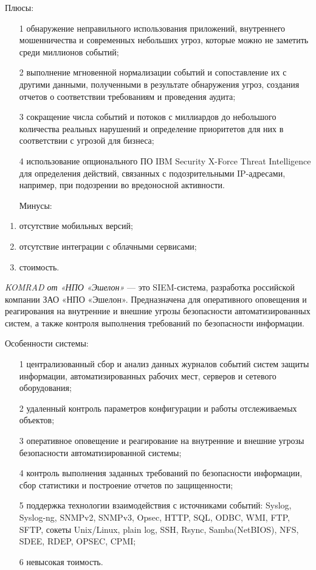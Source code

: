 Плюсы:
\begin{enumerate}
\item [1]обнаружение неправильного использования приложений, внутреннего мошенничества и современных небольших угроз, которые можно не заметить среди миллионов событий;
\item [2]выполнение мгновенной нормализации событий и сопоставление их с другими данными, полученными в результате обнаружения угроз, создания отчетов о соответствии требованиям и проведения аудита; 
\item [3]сокращение числа событий и потоков с миллиардов до небольшого количества реальных нарушений и определение приоритетов для них в соответствии с угрозой для бизнеса;
\item [4]использование опционального ПО IBM Security X-Force Threat Intelligence для определения действий, связанных с подозрительными IP-адресами, например, при подозрении во вредоносной активности.

\newpage
Минусы:
\end{enumerate}
\begin {enumerate}
\item[1]отсутствие мобильных версий;
\item[2]отсутствие интеграции с облачными сервисами;
\item[3]стоимость.
\end{enumerate}




\textit{KOMRAD от «НПО «Эшелон»} --- это SIEM-система, разработка российской компании ЗАО «НПО «Эшелон». Предназначена для оперативного оповещения и реагирования на внутренние и внешние угрозы безопасности автоматизированных систем, а также контроля выполнения требований по безопасности информации.

Особенности системы:
\begin{enumerate}
    \item [1]централизованный сбор и анализ данных журналов событий систем защиты информации, автоматизированных рабочих мест, серверов и сетевого оборудования;
    \item [2]удаленный контроль параметров конфигурации и работы отслеживаемых объектов;
    \item [3]оперативное оповещение и реагирование на внутренние и внешние угрозы безопасности автоматизированной системы;
    \item [4]контроль выполнения заданных требований по безопасности информации, сбор статистики и построение отчетов по защищенности;
    \item [5]поддержка технологии взаимодействия с источниками событий: Syslog, Syslog-ng, SNMPv2, SNMPv3, Opsec, HTTP, SQL, ODBC, WMI, FTP, SFTP, сокеты Unix/Linux, plain log, SSH, Rsync, Samba(NetBIOS), NFS, SDEE, RDEP, OPSEC, CPMI;
    \item [6]невысокая тоимость.
\end{enumerate}

